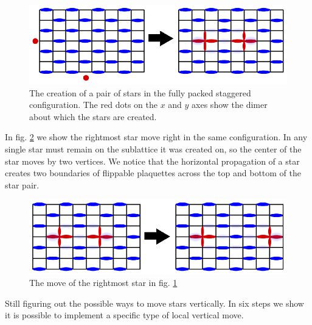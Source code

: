 \documentclass[aps,floatfix,11pt]{revtex4-1}
\begin{document}
\begin{figure}[h]
    \centering
    \includegraphics[width=8.5 cm]{old_create_pair}
    \caption{The creation of a pair of stars in the fully packed staggered configuration. The red
    dots on the $x$ and $y$ axes show the dimer about which the stars are created.
\label{fig:old_create_pair}}
\end{figure}

\noindent In fig. \ref{fig:old_move_right} we show the rightmost star move right in the same
configuration. In any single star must remain on the sublattice it was created on, so the center of
the star moves by two vertices. We notice that the horizontal propagation of a star creates two boundaries of
flippable plaquettes across the top and bottom of the star pair. 

\begin{figure}[h]
    \centering
    \includegraphics[width=8.5 cm]{old_move_right}
    \caption{The move of the rightmost star in fig. \ref{fig:old_create_pair} \label{fig:old_move_right}}
\end{figure}

Still figuring out the possible ways to move stars vertically. In six steps we show it is possible
to implement a specific type of local vertical move. 
\\
\end{document}
